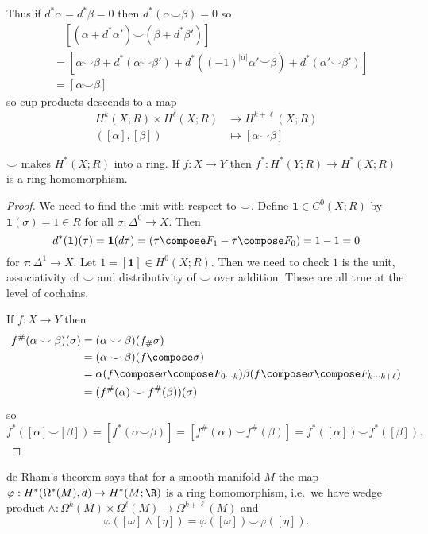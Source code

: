 \documentclass[a4paper]{article}
\newcommand*{\cp}{\smile} %
\begin{document}
Thus if \(d^*\alpha = d^*\beta = 0\) then \(d^*(\alpha \cp \beta) = 0\) so
\begin{align*}
  &\quad [(\alpha + d^* \alpha') \cp (\beta + d^* \beta')] \\
  &= [\alpha \cp \beta + d^*(\alpha \cp \beta') + d^*((-1)^{|\alpha|} \alpha' \cp \beta) + d^*(\alpha' \cp \beta')] \\
  &= [\alpha \cp \beta]
\end{align*}
so cup products descends to a map
\begin{align*}
  H^k(X; R) \times H^\ell(X; R) &\to H^{k + \ell}(X; R) \\
  ([\alpha], [\beta]) &\mapsto [\alpha \cp \beta]
\end{align*}

\begin{proposition}
  \(\cp\) makes \(H^*(X; R)\) into a ring. If \(f: X \to Y\) then \(f^*: H^*(Y; R) \to H^*(X; R)\) is a ring homomorphism.
\end{proposition}

\begin{proof}
  We need to find the unit with respect to \(\cp\). Define \(\mathbf 1 \in C^0(X; R)\) by \(\mathbf 1(\sigma) = 1 \in R\) for all \(\sigma: \Delta^0 \to X\). Then
  \[
    d^*(\mathbf 1)(\tau) = \mathbf 1(d \tau) = \mathbf (\tau \compose F_1 - \tau \compose F_0) = 1 - 1 = 0
  \]
  for \(\tau: \Delta^1 \to X\). Let \(1 = [\mathbf 1] \in H^0(X; R)\). Then we need to check \(1\) is the unit, associativity of \(\cp\) and distributivity of \(\cp\) over addition. These are all true at the level of cochains.

  If \(f: X \to Y\) then
  \begin{align*}
    f^\#(\alpha \cp \beta) (\sigma)
    &= (\alpha \cp \beta) (f_\# \sigma) \\
    &= (\alpha \cp \beta) (f \compose \sigma) \\
    &= \alpha(f \compose \sigma \compose F_{0 \cdots k}) \beta (f \compose \sigma \compose F_{k \cdots k + \ell}) \\
    &= (f^\#(\alpha) \cp f^\#(\beta)) (\sigma)
  \end{align*}
  so
  \[
    f^*([\alpha] \cp [\beta])
    = [f^*(\alpha \cp \beta)]
    = [f^\#(\alpha) \cp f^\#(\beta)]
    = f^*([\alpha]) \cp f^*([\beta]).
  \]
\end{proof}

\begin{remark}
  de Rham's theorem says that for a smooth manifold \(M\) the map \(\varphi: H^*(\Omega^*(M), d) \to H^*(M; \R)\) is a ring homomorphism, i.e.\ we have wedge product \(\wedge: \Omega^k(M) \times \Omega^\ell(M) \to \Omega^{k + \ell}(M)\) and
  \[
    \varphi([\omega] \wedge [\eta]) = \varphi([\omega]) \cp \varphi([\eta]).
  \]
\end{remark}
\end{document}
